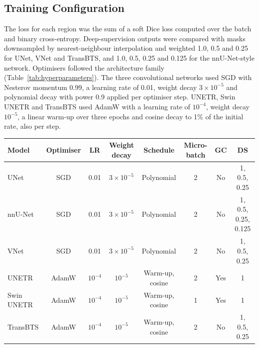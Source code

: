 \documentclass[a4paper,fleqn]{cas-sc}
\begin{document}
\subsection{Training Configuration}
\label{sec:training}

The loss for each region was the sum of a soft Dice loss computed over the batch and binary cross-entropy. Deep-supervision outputs were compared with masks downsampled by nearest-neighbour interpolation and weighted 1.0, 0.5 and 0.25 for UNet, VNet and TransBTS, and 1.0, 0.5, 0.25 and 0.125 for the nnU-Net-style network. Optimisers followed the architecture family (Table~\ref{tab:hyperparameters}). The three convolutional networks used SGD with Nesterov momentum 0.99, a learning rate of 0.01, weight decay $3\times 10^{-5}$ and polynomial decay with power 0.9 applied per optimiser step. UNETR, Swin UNETR and TransBTS used AdamW with a learning rate of $10^{-4}$, weight decay $10^{-5}$, a linear warm-up over three epochs and cosine decay to 1\% of the initial rate, also per step.

\begin{heretable}
\centering
\caption{Training settings by model. All models used 50 epochs, an effective batch of 4 volumes (3,250 optimiser steps), gradient clipping at 1.0 and half-precision autocasting. SGD uses Nesterov momentum 0.99 and polynomial decay with power 0.9; AdamW uses cosine decay after a 3-epoch warm-up. DS: deep-supervision weights; GC: gradient checkpointing.}
\label{tab:hyperparameters}
\small
\begin{tabular*}{\textwidth}{@{\extracolsep{\fill}}lccccccc@{}}
\toprule
Model & Optimiser & LR & Weight decay & Schedule & Micro-batch & GC & DS \\
\midrule
UNet & SGD & 0.01 & $3\times 10^{-5}$ & Polynomial & 2 & No & 1, 0.5, 0.25 \\
nnU-Net & SGD & 0.01 & $3\times 10^{-5}$ & Polynomial & 2 & No & 1, 0.5, 0.25, 0.125 \\
VNet & SGD & 0.01 & $3\times 10^{-5}$ & Polynomial & 2 & No & 1, 0.5, 0.25 \\
UNETR & AdamW & $10^{-4}$ & $10^{-5}$ & Warm-up, cosine & 2 & Yes & 1 \\
Swin UNETR & AdamW & $10^{-4}$ & $10^{-5}$ & Warm-up, cosine & 1 & Yes & 1 \\
TransBTS & AdamW & $10^{-4}$ & $10^{-5}$ & Warm-up, cosine & 2 & No & 1, 0.5, 0.25 \\
\bottomrule
\end{tabular*}
\end{heretable}
\end{document}
